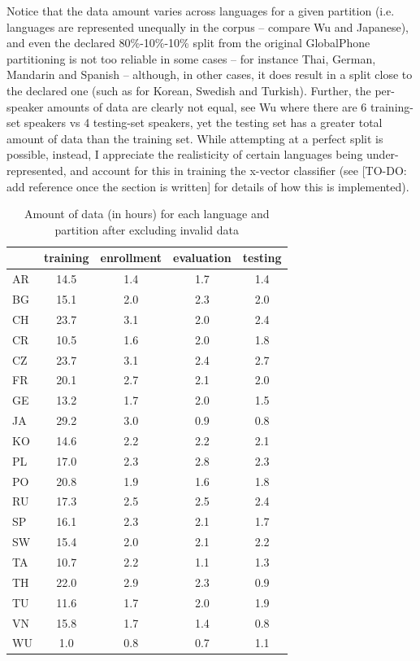 \documentclass[bsc,frontabs,twoside,singlespacing,parskip,deptreport]{infthesis}
\begin{document}
{{    Notice that the data amount varies across languages for a given partition (i.e. languages are represented unequally in the corpus -- compare Wu and Japanese), and even the declared 80\%-10\%-10\% split from the original GlobalPhone partitioning is not too reliable in some cases -- for instance Thai, German, Mandarin and Spanish -- although, in other cases, it does result in a split close to the declared one (such as for Korean, Swedish and Turkish). Further, the per-speaker amounts of data are clearly not equal, see Wu where there are 6 training-set speakers vs 4 testing-set speakers, yet the testing set has a greater total amount of data than the training set. While attempting at a perfect split is possible, instead, I appreciate the realisticity of certain languages being under-represented, and account for this in training the x-vector classifier (see [TO-DO: add reference once the section is written] for details of how this is implemented).

    \begin{table}[h!tb]
      \centering
      \begin{sc}
        \footnotesize
        \begin{tabular}{l|c|c|c|c}
             & training & enrollment & evaluation & testing \\
          \hline
          AR & 14.5 & 1.4 & 1.7 & 1.4\\
          BG & 15.1 & 2.0 & 2.3 & 2.0\\
          CH & 23.7 & 3.1 & 2.0 & 2.4\\
          CR & 10.5 & 1.6 & 2.0 & 1.8\\
          CZ & 23.7 & 3.1 & 2.4 & 2.7\\
          FR & 20.1 & 2.7 & 2.1 & 2.0\\
          GE & 13.2 & 1.7 & 2.0 & 1.5\\
          JA & 29.2 & 3.0 & 0.9 & 0.8\\
          KO & 14.6 & 2.2 & 2.2 & 2.1\\
          PL & 17.0 & 2.3 & 2.8 & 2.3\\
          PO & 20.8 & 1.9 & 1.6 & 1.8\\
          RU & 17.3 & 2.5 & 2.5 & 2.4\\
          SP & 16.1 & 2.3 & 2.1 & 1.7\\
          SW & 15.4 & 2.0 & 2.1 & 2.2\\
          TA & 10.7 & 2.2 & 1.1 & 1.3\\
          TH & 22.0 & 2.9 & 2.3 & 0.9\\
          TU & 11.6 & 1.7 & 2.0 & 1.9\\
          VN & 15.8 & 1.7 & 1.4 & 0.8\\
          WU & 1.0 & 0.8 & 0.7 & 1.1\\
        \end{tabular}
      \end{sc}
      \caption{Amount of data (in hours) for each language and partition after excluding invalid data}
      \label{tab:data-amounts}
    \end{table}
  }
}
\end{document}
